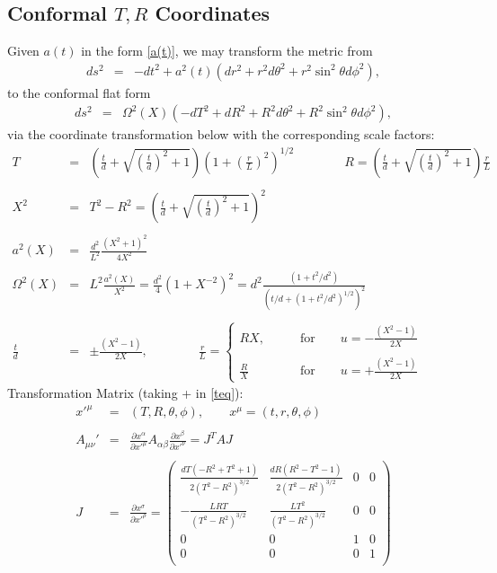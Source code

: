 \documentclass[10pt,letterpaper]{article}
\numberwithin{equation}{section}
\begin{document}
\subsection{Conformal $T,R$ Coordinates}
Given $a(t)$ in the form \eqref{a(t)}, we may transform the metric from
\begin{eqnarray}
ds^2&=& -dt^2 + a^2(t)( dr^2 + r^2d\theta^2 + r^2\sin^2\theta d\phi^2),
\end{eqnarray}
to the conformal flat form
\begin{eqnarray}
ds^2&=& \Omega^2(X)( -dT^2+dR^2 + R^2d\theta^2 +R^2\sin^2\theta d\phi^2),
\end{eqnarray}
via the coordinate transformation below with the corresponding scale factors:
\begin{eqnarray}
T &=& \left( \frac{t}{d} + \sqrt{\left(\frac{t}{d}\right)^2+1}\right) \left(1+ \left(\frac{r}{L}\right)^2\right)^{1/2}
\qquad\qquad
R = \left( \frac{t}{d} + \sqrt{\left(\frac{t}{d}\right)^2+1}\right)\frac{r}{L}
\\ \nonumber\\
X^2 &=& T^2-R^2 = \left( \frac{t}{d} + \sqrt{\left(\frac{t}{d}\right)^2+1}\right)^2
\\ \nonumber\\
a^2(X) &=& \frac{d^2}{L^2} \frac{(X^2+1)^2}{4X^2}
\\ \nonumber\\
\Omega^2(X) &=& L^2 \frac{a^2(X)}{X^2} = \frac{d^2}{4}(1+X^{-2})^2 = d^2 \frac{(1+t^2/d^2)}{(t/d+(1+t^2/d^2)^{1/2})^2}
\\ \nonumber\\
\frac{t}{d} &=& \pm\frac{(X^2-1)}{2X},\qquad\qquad 
\frac{r}{L} = 
\begin{cases}
	RX,&\qquad\text{for}\qquad u = -\frac{(X^2-1)}{2X}
\\ \\
	\frac{R}{X}&\qquad\text{for}\qquad u = +\frac{(X^2-1)}{2X}
\end{cases}
\label{teq}
\end{eqnarray}
Transformation Matrix (taking + in \eqref{teq}):
\begin{eqnarray}
x'^\mu &=& (T,R,\theta,\phi),\qquad x^\mu = (t,r,\theta,\phi)
\\ \nonumber\\
A_{\mu\nu}' &=& \frac{\partial x^\alpha}{\partial x'^\mu}A_{\alpha\beta}\frac{\partial x^\beta}{\partial x'^\nu}
= J^T A J
\\ \nonumber\\
J &=& \frac{\partial x^\sigma}{\partial x'^\rho} = 
\left(
\begin{array}{cccc}
\frac{d T \left(-R^2+T^2+1\right)}{2 \left(T^2-R^2\right)^{3/2}} & \frac{d R \left(R^2-T^2-1\right)}{2 \left(T^2-R^2\right)^{3/2}} & 0 & 0 \\
-\frac{L R T}{\left(T^2-R^2\right)^{3/2}} & \frac{L T^2}{\left(T^2-R^2\right)^{3/2}} & 0 & 0 \\
0 & 0 & 1 & 0 \\
0 & 0 & 0 & 1 \\
\end{array}
\right)
\end{eqnarray}
\end{document}
